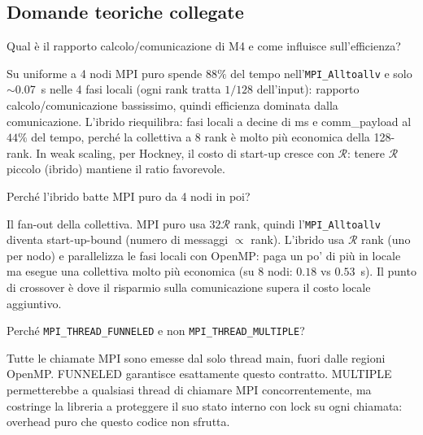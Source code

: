 \documentclass[11pt,a4paper]{article}
\theoremstyle{remark}
\newenvironment{esercizio}[1][]{%
  \begin{tcolorbox}[breakable,title={\textbf{Esercizio / Domanda d'esame}\ifx&#1&\else: #1\fi},
    colback=yellow!5!white, colframe=orange!75!black, fonttitle=\small\bfseries]%
}{%
  \end{tcolorbox}%
}
\newenvironment{risposta}{%
  \begin{tcolorbox}[breakable,title={\textbf{Risposta}},
    colback=green!5!white, colframe=green!50!black, fonttitle=\small\bfseries]%
}{%
  \end{tcolorbox}%
}
\begin{document}
\subsection{Domande teoriche collegate}

\begin{esercizio}[M4 -- Computation-to-communication ratio]
Qual \`e il rapporto calcolo/comunicazione di M4 e come influisce sull'efficienza?
\end{esercizio}
\begin{risposta}
Su uniforme a 4 nodi MPI puro spende $88\%$ del tempo nell'\texttt{MPI\_Alltoallv} e solo $\sim$0.07~s nelle 4 fasi locali (ogni rank tratta $1/128$ dell'input): rapporto calcolo/comunicazione bassissimo, quindi efficienza dominata dalla comunicazione. L'ibrido riequilibra: fasi locali a decine di ms e comm\_payload al $44\%$ del tempo, perch\'e la collettiva a 8 rank \`e molto pi\`u economica della 128-rank. In weak scaling, per Hockney, il costo di start-up cresce con $\mathcal{R}$: tenere $\mathcal{R}$ piccolo (ibrido) mantiene il ratio favorevole.
\end{risposta}

\begin{esercizio}[M4 -- MPI vs MPI+OpenMP]
Perch\'e l'ibrido batte MPI puro da 4 nodi in poi?
\end{esercizio}
\begin{risposta}
Il fan-out della collettiva. MPI puro usa $32\mathcal{R}$ rank, quindi l'\texttt{MPI\_Alltoallv} diventa start-up-bound (numero di messaggi $\propto$ rank). L'ibrido usa $\mathcal{R}$ rank (uno per nodo) e parallelizza le fasi locali con OpenMP: paga un po' di pi\`u in locale ma esegue una collettiva molto pi\`u economica (su 8 nodi: $0.18$ vs $0.53$~s). Il punto di crossover \`e dove il risparmio sulla comunicazione supera il costo locale aggiuntivo.
\end{risposta}

\begin{esercizio}[M4 -- THREAD\_FUNNELED]
Perch\'e \texttt{MPI\_THREAD\_FUNNELED} e non \texttt{MPI\_THREAD\_MULTIPLE}?
\end{esercizio}
\begin{risposta}
Tutte le chiamate MPI sono emesse dal solo thread main, fuori dalle regioni OpenMP. FUNNELED garantisce esattamente questo contratto. MULTIPLE permetterebbe a qualsiasi thread di chiamare MPI concorrentemente, ma costringe la libreria a proteggere il suo stato interno con lock su ogni chiamata: overhead puro che questo codice non sfrutta.
\end{risposta}
\end{document}
